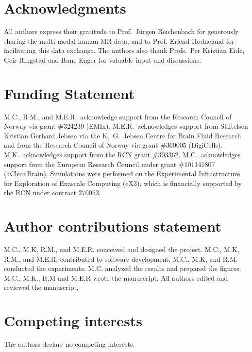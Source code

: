\documentclass[fleqn,10pt]{wlscirep}
\begin{document}


\section*{Acknowledgments}

All authors express their gratitude to Prof.~Jürgen Reichenbach for
generously sharing the multi-modal human MR data, and to Prof. Erlend
Hodneland for facilitating this data exchange. The authors also thank
Profs.~Per Kristian Eide, Geir Ringstad and Rune Enger for valuable
input and discussions.

\section*{Funding Statement}

M.C., R.M., and M.E.R.~acknowledge support from the Research Council of Norway via grant \#324239 (EMIx). M.E.R.~acknowledges support from Stiftelsen Kristian Gerhard Jebsen via the K.~G.~Jebsen Centre for Brain Fluid Research and from the Research Council of Norway via grant \#360005 (DigiCells). M.K.~acknowledges support from the RCN grant \#303362. M.C.~acknowledges support from the European Research Council under grant \#101141807 (aCleanBrain). Simulations were performed on the Experimental Infrastructure for Exploration of Exascale Computing (eX3), which is financially supported by the RCN under contract 270053. 

\section*{Author contributions statement}

M.C., M.K, R.M., and M.E.R. conceived and designed the project.
M.C., M.K, R.M., and M.E.R. contributed to software development. 
M.C., M.K, and R.M. conducted the experiments.
M.C. analyzed the results and prepared the figures.
M.C., M.K., R.M and M.E.R wrote the manuscript. 
All authors edited and reviewed the manuscript.

\section*{Competing interests}

The authors declare no competing interests.



\end{document}
